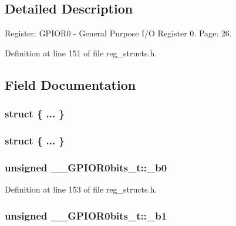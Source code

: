 \subsection{Detailed Description}
Register\+: G\+P\+I\+O\+R0 -\/ General Purpose I/\+O Register 0. Page\+: 26. 

Definition at line 151 of file reg\+\_\+structs.\+h.



\subsection{Field Documentation}
\hypertarget{union_____g_p_i_o_r0bits__t_a2813ccb9405e62fbbc00f36ba9b5d9ae}{\subsubsection[{"@33}]{\setlength{\rightskip}{0pt plus 5cm}struct \{ ... \} }}\label{union_____g_p_i_o_r0bits__t_a2813ccb9405e62fbbc00f36ba9b5d9ae}
\hypertarget{union_____g_p_i_o_r0bits__t_a943f41acaf38366d1a118d1030906c9e}{\subsubsection[{"@35}]{\setlength{\rightskip}{0pt plus 5cm}struct \{ ... \} }}\label{union_____g_p_i_o_r0bits__t_a943f41acaf38366d1a118d1030906c9e}
\hypertarget{union_____g_p_i_o_r0bits__t_ab272f435a6eaca47d0010830e14de174}{
\subsubsection[{\+\_\+b0}]{\setlength{\rightskip}{0pt plus 5cm}unsigned \+\_\+\+\_\+\+G\+P\+I\+O\+R0bits\+\_\+t\+::\+\_\+b0}}\label{union_____g_p_i_o_r0bits__t_ab272f435a6eaca47d0010830e14de174}


Definition at line 153 of file reg\+\_\+structs.\+h.

\hypertarget{union_____g_p_i_o_r0bits__t_a8a68c39daf41f54e9d35b07143754709}{
\subsubsection[{\+\_\+b1}]{\setlength{\rightskip}{0pt plus 5cm}unsigned \+\_\+\+\_\+\+G\+P\+I\+O\+R0bits\+\_\+t\+::\+\_\+b1}}\label{union_____g_p_i_o_r0bits__t_a8a68c39daf41f54e9d35b07143754709}


